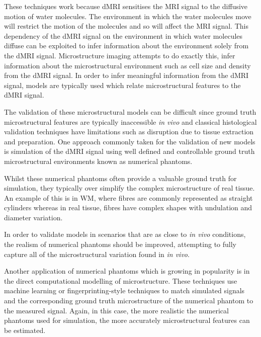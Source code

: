 \begin{comment}
\ac{MRI} provides researchers and clinicians a powerful and flexible tool for non-invasively imaging the human body \emph{in vivo} and has found extensive use over the past few decades in furthering the understanding the structure and function of the human brain.
One technique which is commonly employed to study the structure of the human brain is \ac{dMRI}.
\end{comment}

These techniques work because \ac{dMRI} sensitises the \ac{MRI} signal to the diffusive motion of water molecules.
The environment in which the water molecules move will restrict the motion of the molecules and so will affect the \ac{MRI} signal. 
This dependency of the \ac{dMRI} signal on the environment in which water molecules diffuse can be exploited to infer information about the environment solely from the \ac{dMRI} signal.  
Microstructure imaging attempts to do exactly this, infer information about the microstructural environment such as cell size and density from the \ac{dMRI} signal.
In order to infer meaningful information from the \ac{dMRI} signal, models are typically used which relate microstructural features to the \ac{dMRI} signal.

The validation of these microstructural models can be difficult since ground truth microstructural features are typically inaccessible \emph{in vivo} and classical histological validation techniques have limitations such as disruption due to tissue extraction and preparation. 
One approach commonly taken for the validation of new models is simulation of the \ac{dMRI} signal using well defined and controllable ground truth microstructural environments known as numerical phantoms. 

Whilst these numerical phantoms often provide a valuable ground truth for simulation, they typically over simplify the complex microstructure of real tissue.
An example of this is in \ac{WM}, where fibres are commonly represented as straight cylinders\cite{Hall2009,Leemans2005} whereas in real tissue, fibres have complex shapes with undulation and diameter variation\cite{Nilsson2013,Lee2018a}.

In order to validate models in scenarios that are as close to \emph{in vivo} conditions, the realism of numerical phantoms should be improved, attempting to fully capture all of the microstructural variation found in \emph{in vivo}.

Another application of numerical phantoms which is growing in popularity is in the direct computational modelling of microstructure.
These techniques use machine learning or fingerprinting-style techniques to match simulated signals and the corresponding ground truth microstructure of the numerical phantom to the measured signal\cite{Rensonnet2018,Hill2018,Palombo2018a,Nedjati-Gilani2017}.
Again, in this case, the more realistic the numerical phantoms used for simulation, the more accurately microstructural features can be estimated. 

